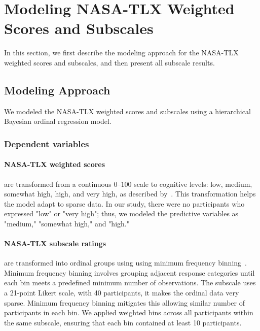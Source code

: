 \section{Modeling NASA-TLX Weighted Scores and Subscales}
\label{apdx:model_tlx}
In this section, we first describe the modeling approach for the NASA-TLX weighted scores and subscales, and then present all subscale results.

\subsection{Modeling Approach}
We modeled the NASA-TLX weighted scores and subscales using a hierarchical Bayesian ordinal regression model. 

\subsubsection{Dependent variables}
\paragraph{NASA-TLX weighted scores} are transformed from a continuous $0$–$100$ scale to cognitive levels: low, medium, somewhat high, high, and very high, as described by~\citet{hart1988development}. This transformation helps the model adapt to sparse data. In our study, there were no participants who expressed "low" or "very high"; thus, we modeled the predictive variables as "medium," "somewhat high," and "high."

\paragraph{NASA-TLX subscale ratings} are transformed into ordinal groups using using minimum frequency binning~\cite{frank2001simple}. Minimum frequency binning involves grouping adjacent response categories until each bin meets a predefined minimum number of observations. The subscale uses a 21-point Likert scale, with 40 participants, it makes the ordinal data very sparse. Minimum frequency binning mitigates this allowing similar number of participants in each bin. We applied weighted bins across all participants within the same subscale, ensuring that each bin contained at least 10 participants.

